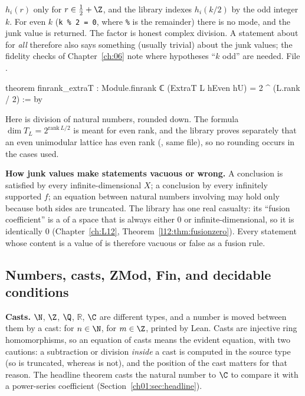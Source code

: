 $h_i(r)$ only for $r\in\frac12+\Z$, and the library indexes $h_i(k/2)$ by the odd integer $k$. For
even $k$ (\texttt{k \% 2 = 0}, where \texttt{\%} is the remainder) there is no mode, and the junk value
 is returned. The factor  is honest complex division. A statement about
 for \emph{all}  therefore also says something (usually trivial) about the junk
values; the fidelity checks of Chapter~\ref{ch:06} note where hypotheses ``$k$ odd'' are needed.
\noindent File .
\begin{leancode}
theorem finrank_extraT : Module.finrank ℂ (ExtraT L hEven hU) = 2 ^ (L.rank / 2) := by
\end{leancode}
Here  is division of natural numbers, rounded down. The formula $\dim T_L =
2^{\mathrm{rank}\,L/2}$ is meant for even rank, and the library proves separately that an even
unimodular lattice has even rank (, same file), so no rounding occurs
in the cases used.

\begin{warning}
\textbf{How junk values make statements vacuous or wrong.} A conclusion
 is satisfied by every infinite-dimensional $X$; a conclusion
 by every infinitely supported $f$; an equation between natural numbers involving
 may hold only because both sides are truncated. The library has one real casualty: its
``fusion coefficient''  is a  of a space that is always either
$0$ or infinite-dimensional, so it is identically $0$ (Chapter~\ref{ch:L12},
Theorem~\ref{l12:thm:fusionzero}). Every statement
whose content is a value of  is therefore vacuous or false as a fusion rule.
\end{warning}

\subsection{Numbers, casts, ZMod, Fin, and decidable conditions}\label{ch01:sec:numbers}

\textbf{Casts.} $\N$, $\Z$, $\Q$, $\mathbb R$, $\C$ are different types, and a number is moved between
them by a cast:  for $n\in\N$,  for $m\in\Z$, printed  by Lean.
Casts are injective ring homomorphisms, so an equation of casts means the evident equation, with two
cautions: a subtraction or division \emph{inside} a cast is computed in the source type (so
 is truncated, whereas  is not), and the position of the
cast matters for that reason. The headline theorem casts the natural number  to $\C$ to
compare it with a power-series coefficient (Section~\ref{ch01:sec:headline}).

